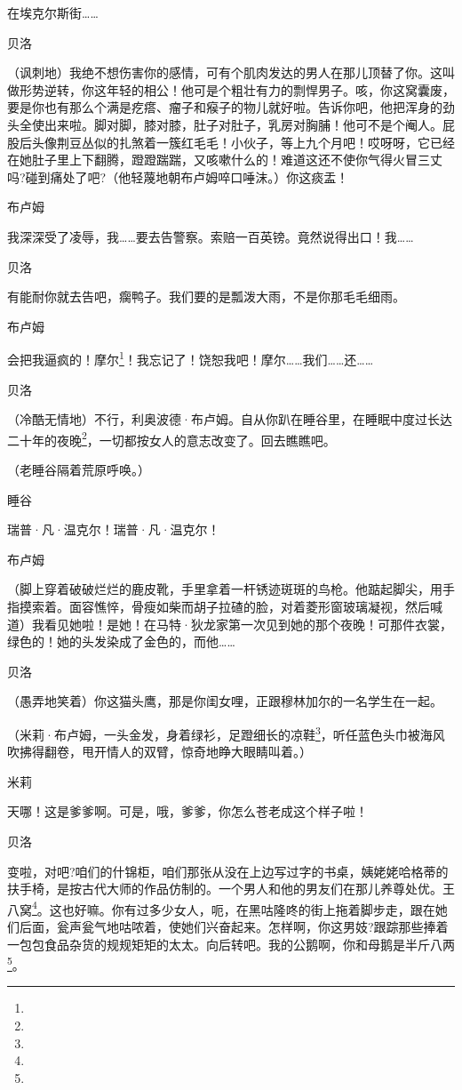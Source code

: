 \par 在埃克尔斯街……
\par 贝洛
\par （讽刺地）我绝不想伤害你的感情，可有个肌肉发达的男人在那儿顶替了你。这叫做形势逆转，你这年轻的相公！他可是个粗壮有力的剽悍男子。咳，你这窝囊废，要是你也有那么个满是疙瘩、瘤子和瘊子的物儿就好啦。告诉你吧，他把浑身的劲头全使出来啦。脚对脚，膝对膝，肚子对肚子，乳房对胸脯！他可不是个阉人。屁股后头像荆豆丛似的扎煞着一簇红毛毛！小伙子，等上九个月吧！哎呀呀，它已经在她肚子里上下翻腾，蹬蹬踹踹，又咳嗽什么的！难道这还不使你气得火冒三丈吗?碰到痛处了吧?（他轻蔑地朝布卢姆啐口唾沫。）你这痰盂！
\par 布卢姆
\par 我深深受了凌辱，我……要去告警察。索赔一百英镑。竟然说得出口！我……
\par 贝洛
\par 有能耐你就去告吧，瘸鸭子。我们要的是瓢泼大雨，不是你那毛毛细雨。
\par 布卢姆
\par 会把我逼疯的！摩尔\footnote{}！我忘记了！饶恕我吧！摩尔……我们……还……
\par 贝洛
\par （冷酷无情地）不行，利奥波德·布卢姆。自从你趴在睡谷里，在睡眠中度过长达二十年的夜晚\footnote{}，一切都按女人的意志改变了。回去瞧瞧吧。
\par （老睡谷隔着荒原呼唤。）
\par 睡谷
\par 瑞普·凡·温克尔！瑞普·凡·温克尔！
\par 布卢姆
\par （脚上穿着破破烂烂的鹿皮靴，手里拿着一杆锈迹斑斑的鸟枪。他踮起脚尖，用手指摸索着。面容憔悴，骨瘦如柴而胡子拉碴的脸，对着菱形窗玻璃凝视，然后喊道）我看见她啦！是她！在马特·狄龙家第一次见到她的那个夜晚！可那件衣裳，绿色的！她的头发染成了金色的，而他……
\par 贝洛
\par （愚弄地笑着）你这猫头鹰，那是你闺女哩，正跟穆林加尔的一名学生在一起。
\par （米莉·布卢姆，一头金发，身着绿衫，足蹬细长的凉鞋\footnote{}，听任蓝色头巾被海风吹拂得翻卷，甩开情人的双臂，惊奇地睁大眼睛叫着。）
\par 米莉
\par 天哪！这是爹爹啊。可是，哦，爹爹，你怎么苍老成这个样子啦！
\par 贝洛
\par 变啦，对吧?咱们的什锦柜，咱们那张从没在上边写过字的书桌，姨姥姥哈格蒂的扶手椅，是按古代大师的作品仿制的。一个男人和他的男友们在那儿养尊处优。王八窝\footnote{}。这也好嘛。你有过多少女人，呃，在黑咕隆咚的街上拖着脚步走，跟在她们后面，瓮声瓮气地咕哝着，使她们兴奋起来。怎样啊，你这男妓?跟踪那些捧着一包包食品杂货的规规矩矩的太太。向后转吧。我的公鹅啊，你和母鹅是半斤八两\footnote{}。
